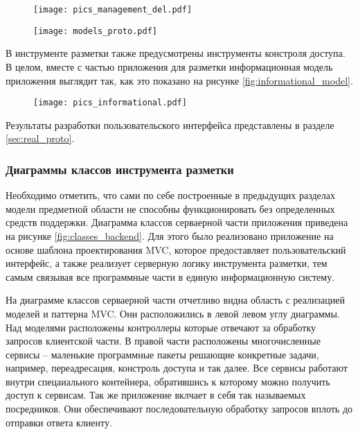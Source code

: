 \documentclass[../main]{subfiles}
\begin{document}
\begin{figure}[H]
    \centering
    {\texttt{[image: pics\_management\_del.pdf]}}
    \vspace{-\baselineskip}
\end{figure}

\begin{figure}[H]
    \centering
    {\texttt{[image: models\_proto.pdf]}}
    \vspace{-\baselineskip}
\end{figure}

В инструменте разметки также предусмотрены инструменты констроля доступа. В целом, вместе с частью приложения для разметки информационная модель приложения выглядит так, как это показано на рисунке \ref{fig:informational_model}.

\begin{figure}[H]
    \centering
    {\texttt{[image: pics\_informational.pdf]}}
    \vspace{-\baselineskip}
\end{figure}

Результаты разработки пользовательского интерфейса представлены в разделе \ref{sec:real_proto}.

\subsubsection{Диаграммы классов инструмента разметки}

Необходимо отметить, что сами по себе построенные в предыдущих разделах модели предметной области не способны функционировать без определенных средств поддержки. Диаграмма классов серваерной части приложения приведена на рисунке \ref{fig:classes_backend}. Для этого было реализовано приложение на основе шаблона проектирования MVC, которое предоставляет пользовательский интерфейс, а также реализует серверную логику инструмента разметки, тем самым связывая все программные части в единую информационную систему.  

На диаграмме классов серваерной части отчетливо видна область с реализацией моделей и паттерна MVC. Они расположились в левой левом углу диаграммы. Над моделями расположены контроллеры которые отвечают за обработку запросов клиентской части. В правой части расположены многочисленные сервисы -- маленькие программные пакеты решающие конкретные задачи, например, переадресация, констроль доступа и так далее. Все сервисы работают внутри спецаиального контейнера, обратившись к которому можно получить доступ к сервисам. Так же приложение вклчает в себя так называемых посредников. Они обеспечивают последовательную обработку запросов вплоть до отправки ответа клиенту.
\end{document}
